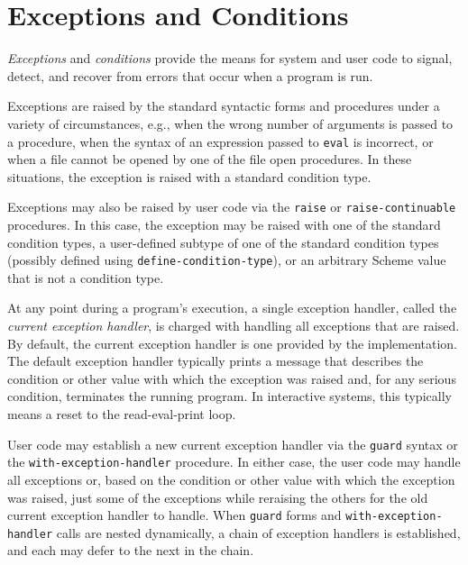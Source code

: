 \chapter{Exceptions and Conditions\label{exceptions_CHPTEXCEPTIONS}}
\label{exceptions_g147}
\label{exceptions_h0}
\begin{figure}[H]
\centering
\setlength{\fboxrule}{3pt}
\end{figure}
\clearpage





\label{exceptions_s0}\label{exceptions_s1}\textit{Exceptions} and
\textit{conditions} provide the means for system and user code
to signal, detect, and recover from errors that occur when
a program is run.


Exceptions are raised by the standard syntactic forms and procedures under
a variety of circumstances, e.g., when the wrong number of arguments is
passed to a procedure, when the syntax of an expression passed to \texttt{eval} is
incorrect, or when a file cannot be opened by one of the file open
procedures.
In these situations, the exception is raised with a standard condition
type.


Exceptions may also be raised by user code via the \texttt{raise} or
\texttt{raise-continuable} procedures.
In this case, the exception may be raised with one of the standard
condition types, a user-defined subtype of one of the standard condition
types (possibly defined using \texttt{define-condition-type}), or an
arbitrary Scheme value that is not a condition type.


\label{exceptions_s2}At any point during a program's execution, a single exception handler,
called the \textit{current exception handler}, is charged with handling all
exceptions that are raised.
By default, the current exception handler is one provided by the
implementation.
The default exception handler typically prints a message that describes
the condition or other value with which the exception was raised and,
for any serious condition, terminates the running program.
In interactive systems, this typically means a reset to the
read-eval-print loop.


User code may establish a new current exception handler via the
\texttt{guard} syntax or the \texttt{with-exception-handler} procedure.
In either case, the user code may handle all exceptions or, based on the
condition or other value with which the exception was raised, just some of
the exceptions while reraising the others for the old current exception
handler to handle.
When \texttt{guard} forms and \texttt{with-exception-handler} calls are
nested dynamically, a chain of exception handlers is established, and
each may defer to the next in the chain.



